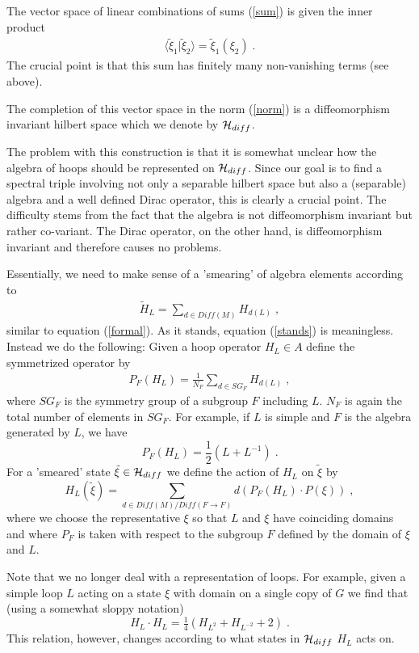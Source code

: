 \documentclass[12pt]{article}
\newcommand{\ba}{\begin{eqnarray}}
\newcommand{\ea}{\end{eqnarray}}
\def\ch{{\cal H}}
\begin{document}
The vector space of linear combinations of sums (\ref{sum}) is given the inner
product
\ba
\langle \tilde{\xi}_1| \tilde{\xi}_2\rangle = \tilde{\xi}_1(\xi_2)\;.
\label{norm}
\ea
The crucial point is that this sum has finitely many non-vanishing terms (see above). 

The completion of this vector space in the norm (\ref{norm}) is a
diffeomorphism invariant hilbert space which we denote by $\ch_{diff}$.

The problem with this construction is that it is somewhat unclear how the algebra
of hoops should be represented on $\ch_{diff}$. Since our goal is to find a spectral triple involving not
only a separable hilbert space but also a (separable) algebra and a well defined
Dirac operator, this is clearly a crucial point. The difficulty stems from the
fact that the algebra is not diffeomorphism invariant but rather
co-variant. The Dirac operator, on the other hand, is diffeomorphism
invariant and therefore causes no problems. 

Essentially, we need to make sense of a 'smearing' of algebra
elements according to
\ba
\tilde{H}_L = \sum_{d\in Diff(M)} H_{d(L)}\;,
\label{stands}
\ea
similar to equation (\ref{formal}). As it stands, equation (\ref{stands}) is
meaningless. Instead we do the following: Given a hoop operator $H_L\in A$
define the symmetrized operator by
\ba
P_F(H_L) = \frac{1}{N_F}\sum_{d \in SG_F}H_{d(L)} \;,
\label{smeared-operator}
\ea
where $SG_F$ is the symmetry group of a subgroup $F$ including $L$. $N_F$ is again the total
number of elements in $SG_F$. For example, if $L$ is simple and $F$ is the
algebra generated by $L$, we have 
\[
P_F(H_L)= \frac{1}{2}\left(L + L^{-1}\right)\;.
\]
For a 'smeared' state $\tilde{\xi}\in \ch_{diff}$  we define the action of
$H_L$ on $\tilde{\xi}$ by
\[
H_L (\tilde{\xi}) = \sum_{d \in Diff(M)/Diff(F\to F)} d(P_F(H_L)\cdot  P(\xi))\;,
\]
where we choose the representative $\xi$ so that $L$ and $\xi$ have coinciding
domains and where $P_F$ is taken with respect to the subgroup $F$ defined by
the domain of $\xi$ and $L$.

Note that we no longer deal with a representation of loops. For example, given
a simple loop $L$ acting on a state $\xi$ with domain on a single copy of $G$
we find that (using a somewhat sloppy notation)
\[
H_L \cdot H_L = \tfrac{1}{4}(H_{L^2} + H_{L^{-2}} + 2)\;.
\]
This relation, however, changes according to what states in $\ch_{diff}$ $H_L$ acts on.
\end{document}
